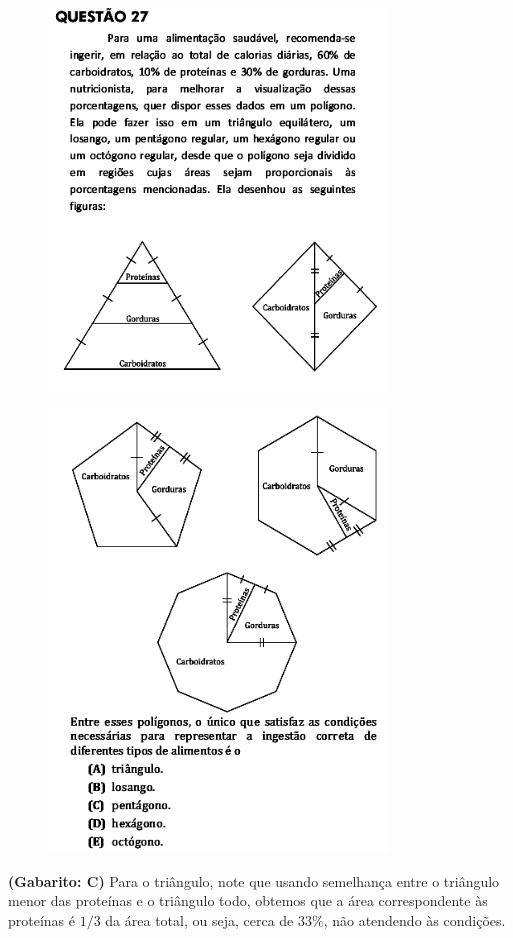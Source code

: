 \documentclass[a4paper]{article}
\begin{document}
\begin{figure}[H]
	\begin{center}
		\includegraphics[width=9cm]{L5Q27_1.png}
	\end{center}
\end{figure}
\begin{figure}[H]
	\begin{center}
		\includegraphics[width=9cm]{L5Q27_2.png}
	\end{center}
\end{figure}
\par\textbf{(Gabarito: C)} Para o triângulo, note que usando semelhança entre o triângulo menor das proteínas e o triângulo todo, obtemos que a área correspondente às proteínas é $1/3$ da área total, ou seja, cerca de $33\%$, não atendendo às condições.
\end{document}

